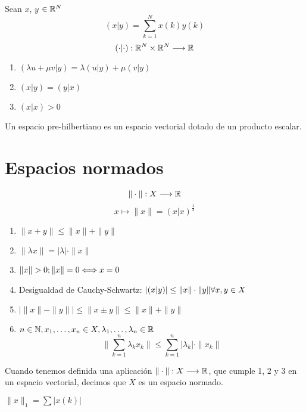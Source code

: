     \begin{definicion}
        Sean $x$, $y$ $\in \mathbb R^N$
        $$(x|y) = \sum_{k=1}^N x(k)y(k)$$
        $$(\cdot|\cdot):\mathbb R^N\times \mathbb R^N \longrightarrow\mathbb R$$
    \end{definicion}
    
        \begin{enumerate}
            \item $(\lambda u + \mu v|y) = \lambda(u|y) + \mu (v|y)$
            \item $(x|y) = (y|x) $
            \item $(x|x) > 0$
        \end{enumerate}
    Un espacio pre-hilbertiano es un espacio vectorial dotado de un producto escalar.
        

\section{Espacios normados}
    \begin{definicion}[Norma]
        $$\|\cdot\|: X \longrightarrow\mathbb R$$
        $$x \longmapsto \|x\| = (x|x)^{\frac{1}{2}}$$   
    \end{definicion}
        \begin{enumerate}
            \item $\|x+y\| \leq\|x\|+\|y\|$
            \item $\|\lambda x\| = |\lambda | \cdot\|x\|$
            \item $\|x\| > 0;\\ \|x\| = 0 \Longleftrightarrow x = 0$
            \item Desigualdad de Cauchy-Schwartz:
            $|(x|y)| \leq \|x\|\cdot \|y\| \\ \forall x, y\in X$
            \item $\left|\|x\|-\|y\|\right| \leq \|x\pm y\| \leq \|x\| + \|y\|$
            \item $n\in \mathbb N, \\ x_1, \ldots , x_n\in X, \\ \lambda_1, \ldots, \lambda_n\in \mathbb R$ \newline
            $$\|\sum_{k=1}^n \lambda_k x_k\| \leq \sum_{k=1}^n |\lambda_k|\cdot\|x_k\|$$
        \end{enumerate}
    Cuando tenemos definida una aplicación $\|\cdot\|: X \longrightarrow\mathbb R$, que cumple 1, 2 y 3 en un espacio vectorial, decimos que $X$ es un espacio normado.
    
    \begin{ejemplo}
        $\|x\|_1 = \sum |x(k)|$
    \end{ejemplo}

